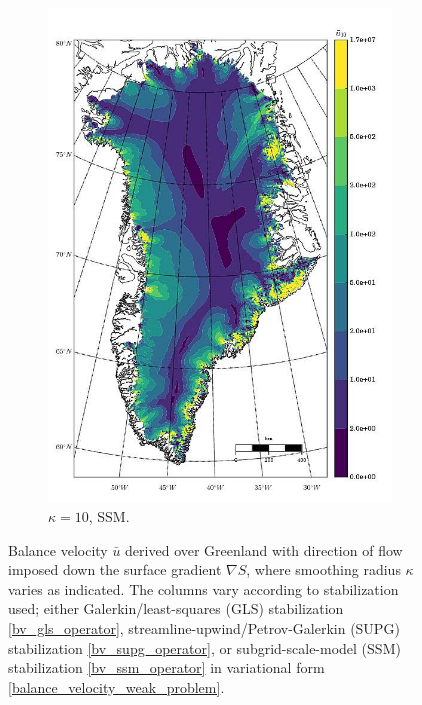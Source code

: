 \begin{figure}
\begin{subfigure}[b]{0.25\linewidth}
    \includegraphics[width=\linewidth]{images/balance_velocity/greenland/Ubar_5H_kappa_10_SSM.jpg}
  \caption{$\kappa = 10$, SSM.}
  \label{greenland_bv_image_kappa_10_SSM}
  \end{subfigure}
 
  \caption[Greenland balance-velocity with $\mathbf{d}^{\text{data}} = -\nabla S$.]{Balance velocity $\bar{u}$ derived over Greenland with direction of flow imposed down the surface gradient $\nabla S$, where smoothing radius $\kappa$ varies as indicated.  The columns vary according to stabilization used; either Galerkin/least-squares (GLS) stabilization \cref{bv_gls_operator}, streamline-upwind/Petrov-Galerkin (SUPG) stabilization \cref{bv_supg_operator}, or subgrid-scale-model (SSM) stabilization \cref{bv_ssm_operator} in variational form \cref{balance_velocity_weak_problem}. \newline}

  \label{greenland_bv_image}

\end{figure}

